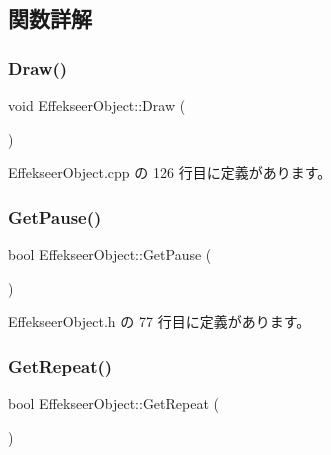\subsection{関数詳解}
\mbox{\label{class_effekseer_object_adc628e5089ca0cdc418e92729943a3b2}} 
\subsubsection{\texorpdfstring{Draw()}{Draw()}}
{\footnotesize\ttfamily void Effekseer\+Object\+::\+Draw (\begin{DoxyParamCaption}{ }\end{DoxyParamCaption})}



 Effekseer\+Object.\+cpp の 126 行目に定義があります。

\mbox{\label{class_effekseer_object_a482a0e824d8719b7676ae15948ae7348}} 
\subsubsection{\texorpdfstring{Get\+Pause()}{GetPause()}}
{\footnotesize\ttfamily bool Effekseer\+Object\+::\+Get\+Pause (\begin{DoxyParamCaption}{ }\end{DoxyParamCaption})\hspace{0.3cm}{\ttfamily [inline]}}



 Effekseer\+Object.\+h の 77 行目に定義があります。

\mbox{\label{class_effekseer_object_a3c44b29c016fb5b3618e2d39060844be}} 
\subsubsection{\texorpdfstring{Get\+Repeat()}{GetRepeat()}}
{\footnotesize\ttfamily bool Effekseer\+Object\+::\+Get\+Repeat (\begin{DoxyParamCaption}{ }\end{DoxyParamCaption})\hspace{0.3cm}{\ttfamily [inline]}}



